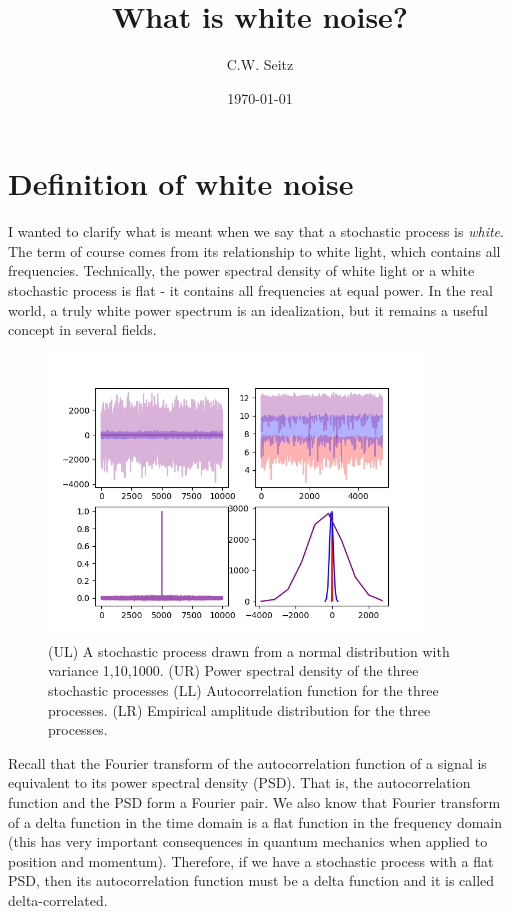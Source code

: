 \documentclass{article}
\title{What is white noise?}
\author{C.W. Seitz}
\date{\today}
\begin{document}
\maketitle

\section{Definition of white noise}

I wanted to clarify what is meant when we say that a stochastic process is \emph{white}. The term of course comes from its relationship to white light, which contains all frequencies. Technically, the power spectral density of white light or a white stochastic process is flat - it contains all frequencies at equal power. In the real world, a truly white power spectrum is an idealization, but it remains a useful concept in several fields. 

\begin{figure}[H]
\centering
\includegraphics[width=10cm]{noise.png}
\caption{(UL) A stochastic process drawn from a normal distribution with variance 1,10,1000. (UR) Power spectral density of the three stochastic processes (LL) Autocorrelation function for the three processes. (LR) Empirical amplitude distribution for the three processes.}
\end{figure}

Recall that the Fourier transform of the autocorrelation function of a signal is equivalent to its power spectral density (PSD). That is, the autocorrelation function and the PSD form a Fourier pair. We also know that Fourier transform of a delta function in the time domain is a flat function in the frequency domain (this has very important consequences in quantum mechanics when applied to position and momentum). Therefore, if we have a stochastic process with a flat PSD, then its autocorrelation function must be a delta function and it is called delta-correlated. 
\end{document}
